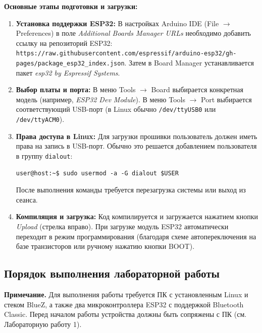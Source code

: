 \textbf{Основные этапы подготовки и загрузки:}
\begin{enumerate}
    \item \textbf{Установка поддержки ESP32:} В настройках Arduino IDE (File $\rightarrow$ Preferences) в поле \textit{Additional Boards Manager URLs} необходимо добавить ссылку на репозиторий ESP32: \texttt{https://raw.githubusercontent.com/espressif/arduino-esp32/gh-pages/package\_esp32\_index.json}. Затем в Board Manager устанавливается пакет \textit{esp32 by Espressif Systems}.
    \item \textbf{Выбор платы и порта:} В меню Tools $\rightarrow$ Board выбирается конкретная модель (например, \textit{ESP32 Dev Module}). В меню Tools $\rightarrow$ Port выбирается соответствующий USB-порт (в Linux обычно \texttt{/dev/ttyUSB0} или \texttt{/dev/ttyACM0}).
    \item \textbf{Права доступа в Linux:} Для загрузки прошивки пользователь должен иметь права на запись в USB-порт. Обычно это решается добавлением пользователя в группу \texttt{dialout}:
    \begin{lstlisting}
user@host:~$ sudo usermod -a -G dialout $USER
    \end{lstlisting}
    После выполнения команды требуется перезагрузка системы или выход из сеанса.
    \item \textbf{Компиляция и загрузка:} Код компилируется и загружается нажатием кнопки \textit{Upload} (стрелка вправо). При загрузке модуль ESP32 автоматически переходит в режим программирования (благодаря схеме автопереключения на базе транзисторов или ручному нажатию кнопки BOOT).
\end{enumerate}

\subsection{Порядок выполнения лабораторной работы}

\textbf{Примечание.} Для выполнения работы требуется ПК с установленным Linux и стеком BlueZ, а также два микроконтроллера ESP32 с поддержкой Bluetooth Classic. Перед началом работы устройства должны быть сопряжены с ПК (см. Лабораторную работу 1).

